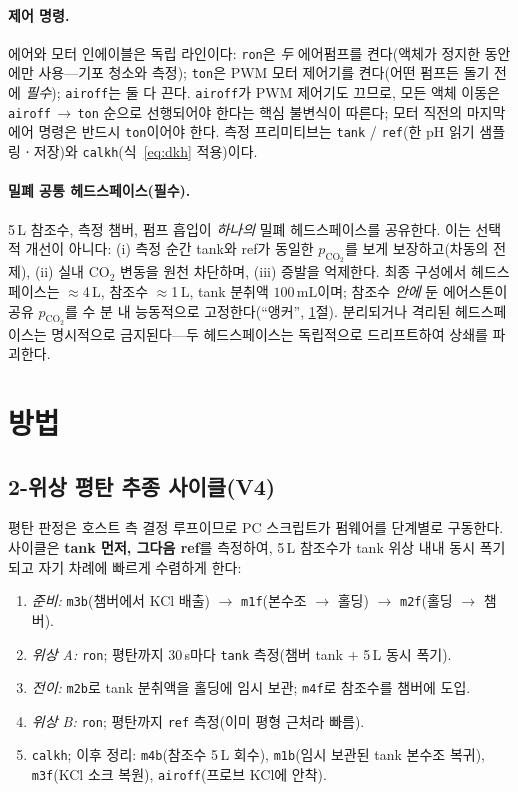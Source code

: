 \documentclass[11pt]{article}
\newcommand{\co}{\ensuremath{\mathrm{CO_2}}}
\newcommand{\pco}{\ensuremath{p_{\mathrm{CO_2}}}}
\begin{document}
\paragraph{제어 명령.} 에어와 모터 인에이블은 독립 라인이다: \texttt{ron}은 \emph{두}
에어펌프를 켠다(액체가 정지한 동안에만 사용---기포 청소와 측정); \texttt{ton}은 PWM
모터 제어기를 켠다(어떤 펌프든 돌기 전에 \emph{필수}); \texttt{airoff}는 둘 다 끈다.
\texttt{airoff}가 PWM 제어기도 끄므로, 모든 액체 이동은
\texttt{airoff}\,$\rightarrow$\,\texttt{ton} 순으로 선행되어야 한다는 핵심 불변식이
따른다; 모터 직전의 마지막 에어 명령은 반드시 \texttt{ton}이어야 한다. 측정
프리미티브는 \texttt{tank} / \texttt{ref}(한 pH 읽기 샘플링ㆍ저장)와
\texttt{calkh}(식~\eqref{eq:dkh} 적용)이다.

\paragraph{밀폐 공통 헤드스페이스(필수).} 5\,L 참조수, 측정 챔버, 펌프 흡입이
\emph{하나의} 밀폐 헤드스페이스를 공유한다. 이는 선택적 개선이 아니다: (i) 측정
순간 tank와 ref가 동일한 \pco{}를 보게 보장하고(차동의 전제), (ii) 실내 \co{} 변동을
원천 차단하며, (iii) 증발을 억제한다. 최종 구성에서 헤드스페이스는 $\approx$4\,L,
참조수 $\approx$1\,L, tank 분취액 $100\,\mathrm{mL}$이며; 참조수 \emph{안에} 둔
에어스톤이 공유 \pco{}를 수 분 내 능동적으로 고정한다(``앵커'',
\ref{sec:methods}절). 분리되거나 격리된 헤드스페이스는 명시적으로 금지된다---두
헤드스페이스는 독립적으로 드리프트하여 상쇄를 파괴한다.

\section{방법}\label{sec:methods}

\subsection{2-위상 평탄 추종 사이클(V4)}
평탄 판정은 호스트 측 결정 루프이므로 PC 스크립트가 펌웨어를 단계별로 구동한다.
사이클은 \textbf{tank 먼저, 그다음 ref}를 측정하여, 5\,L 참조수가 tank 위상 내내
동시 폭기되고 자기 차례에 빠르게 수렴하게 한다:
\begin{enumerate}[nosep,leftmargin=1.6em]
\item \emph{준비:} \texttt{m3b}(챔버에서 KCl 배출)
$\rightarrow$ \texttt{m1f}(본수조 $\to$ 홀딩)
$\rightarrow$ \texttt{m2f}(홀딩 $\to$ 챔버).
\item \emph{위상 A:} \texttt{ron}; 평탄까지 30\,s마다 \texttt{tank} 측정(챔버 tank +
5\,L 동시 폭기).
\item \emph{전이:} \texttt{m2b}로 tank 분취액을 홀딩에 임시 보관; \texttt{m4f}로 참조수를
챔버에 도입.
\item \emph{위상 B:} \texttt{ron}; 평탄까지 \texttt{ref} 측정(이미 평형 근처라 빠름).
\item \texttt{calkh}; 이후 정리: \texttt{m4b}(참조수 5\,L 회수), \texttt{m1b}(임시 보관된
tank 본수조 복귀), \texttt{m3f}(KCl 소크 복원), \texttt{airoff}(프로브 KCl에 안착).
\end{enumerate}
\end{document}
